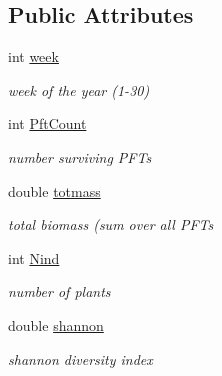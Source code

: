 \subsection*{Public Attributes}
\begin{DoxyCompactItemize}
\item 
\mbox{\label{struct_s_grid_out_a1e78837d22696aa5e550d6b96bbf451e}} 
int \mbox{\hyperlink{struct_s_grid_out_a1e78837d22696aa5e550d6b96bbf451e}{week}}
\begin{DoxyCompactList}\small\item\em week of the year (1-\/30) \end{DoxyCompactList}\item 
\mbox{\label{struct_s_grid_out_ac83542011145c8ed6647e3ec9d45fa52}} 
int \mbox{\hyperlink{struct_s_grid_out_ac83542011145c8ed6647e3ec9d45fa52}{Pft\+Count}}
\begin{DoxyCompactList}\small\item\em number surviving P\+F\+Ts \end{DoxyCompactList}\item 
\mbox{\label{struct_s_grid_out_a7904d65e0f6fb9fcb162388b42bdb721}} 
double \mbox{\hyperlink{struct_s_grid_out_a7904d65e0f6fb9fcb162388b42bdb721}{totmass}}
\begin{DoxyCompactList}\small\item\em total biomass (sum over all P\+F\+Ts \end{DoxyCompactList}\item 
\mbox{\label{struct_s_grid_out_aa0d7426441802ed9a6e745cf82c43125}} 
int \mbox{\hyperlink{struct_s_grid_out_aa0d7426441802ed9a6e745cf82c43125}{Nind}}
\begin{DoxyCompactList}\small\item\em number of plants \end{DoxyCompactList}\item 
\mbox{\label{struct_s_grid_out_aea1f7f52ebe57bdcb26a72953cc88030}} 
double \mbox{\hyperlink{struct_s_grid_out_aea1f7f52ebe57bdcb26a72953cc88030}{shannon}}
\begin{DoxyCompactList}\small\item\em shannon diversity index \end{DoxyCompactList}\item 

\end{DoxyCompactItemize}
